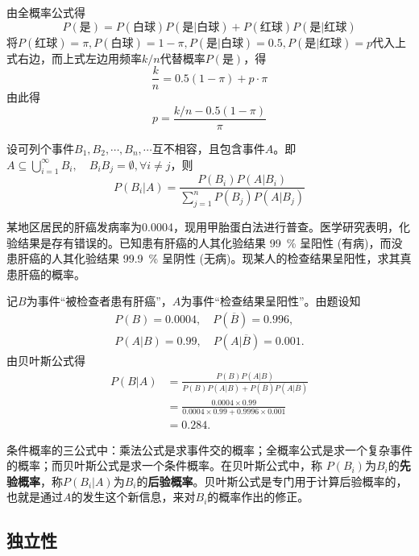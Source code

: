 由全概率公式得
\[ P(\text{是}) = P(\text{白球}) P(\text{是} | \text{白球}) + P(\text{红球}) P(\text{是} | \text{红球}) \]
将$P(\text{红球}) = \pi, P(\text{白球}) = 1-\pi, P(\text{是} | \text{白球}) = 0.5, P(\text{是} | \text{红球}) = p$代入上式右边，而上式左边用频率$k/n$代替概率$P (\text{是})$，得
\[ \frac{k}{n} = 0.5 (1 - \pi) + p \cdot \pi \]
由此得
\[ p = \frac{k/n - 0.5(1 - \pi)}{\pi} \]

\begin{theorem}[Bayes定理]\label{thm:Bayes_Theorem}
    设可列个事件$B_1, B_2, \cdots, B_n, \cdots $互不相容，且包含事件$A$。即$A \subseteq \bigcup_{i=1}^{\infty} B_i,\quad  B_i B_j= \emptyset, \forall i \neq j$，则
    \[ P(B_i | A) = \frac{P(B_i) P(A|B_i)}{\sum_{j=1}^n P(B_j) P(A|B_j)} \]
\end{theorem}

\begin{example}
    某地区居民的肝癌发病率为\num{0.0004}，现用甲胎蛋白法进行普查。医学研究表明，化验结果是存有错误的。已知患有肝癌的人其化验结果 \SI{99}{\percent} 呈阳性 (有病)，而没患肝癌的人其化验结果 \SI{99.9}{\percent} 呈阴性 (无病)。现某人的检查结果呈阳性，求其真患肝癌的概率。
\end{example}
\begin{solution}
    记$B$为事件“被检查者患有肝癌”，$A$为事件“检查结果呈阳性”。由题设知
    \begin{gather*}
        P(B) = 0.0004, \quad P(\overline{B}) = 0.996,\\
        P(A|B) = 0.99, \quad P(A|\overline{B}) = 0.001.
    \end{gather*}
    由贝叶斯公式得
    \begin{align*}
        P(B|A) & = \frac{P(B) P(A|B)}{P(B) P(A|B) + P(\overline{B}) P(A|\overline{B})} \\
               & = \frac{0.0004 \times 0.99}{0.0004 \times 0.99 + 0.9996 \times 0.001} \\
               & = 0.284.
    \end{align*}
\end{solution}

条件概率的三公式中：乘法公式是求事件交的概率；全概率公式是求一个复杂事件的概率；而贝叶斯公式是求一个条件概率。在贝叶斯公式中，称 $P(B_i)$为$B_i$的\textbf{先验概率}，称$P(B_i |A)$为$B_i$的\textbf{后验概率}。贝叶斯公式是专门用于计算后验概率的，也就是通过$A$的发生这个新信息，来对$B_i$的概率作出的修正。

\subsection{独立性}

